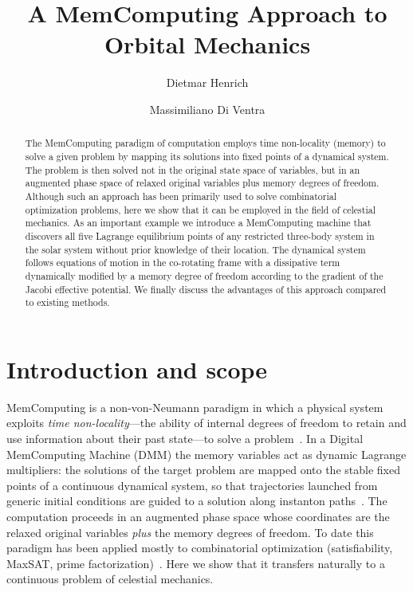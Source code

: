 \documentclass[aip,preprint,amsmath,amssymb,floatfix]{revtex4-2}
\begin{document}
\title{A MemComputing Approach to Orbital Mechanics}

\author{Dietmar Henrich}

\author{Massimiliano Di Ventra}

\begin{abstract}
The MemComputing paradigm of computation employs time non-locality (memory) to
solve a given problem by mapping its solutions into fixed points of a dynamical
system. The problem is then solved not in the original state space of variables,
but in an augmented phase space of relaxed original variables plus memory degrees
of freedom. Although such an approach has been primarily used to solve
combinatorial optimization problems, here we show that it can be employed in the
field of celestial mechanics. As an important example we introduce a MemComputing
machine that discovers all five Lagrange equilibrium points of any restricted
three-body system in the solar system without prior knowledge of their location.
The dynamical system follows equations of motion in the co-rotating frame with a
dissipative term dynamically modified by a memory degree of freedom according to
the gradient of the Jacobi effective potential. We finally discuss the advantages
of this approach compared to existing methods.
\end{abstract}

\maketitle

\section{Introduction and scope}\label{sec:intro}

MemComputing is a non-von-Neumann paradigm in which a physical system exploits
\emph{time non-locality}---the ability of internal degrees of freedom to retain
and use information about their past state---to solve a
problem~\cite{diventra2022}. In a Digital MemComputing Machine (DMM) the memory
variables act as dynamic Lagrange multipliers: the solutions of the target
problem are mapped onto the stable fixed points of a continuous dynamical system,
so that trajectories launched from generic initial conditions are guided to a
solution along instanton paths~\cite{traversa2015,diventra2018}. The computation
proceeds in an augmented phase space whose coordinates are the relaxed original
variables \emph{plus} the memory degrees of freedom. To date this paradigm has
been applied mostly to combinatorial optimization (satisfiability, MaxSAT, prime
factorization)~\cite{traversa2017}. Here we show that it transfers naturally to a
continuous problem of celestial mechanics.
\end{document}
